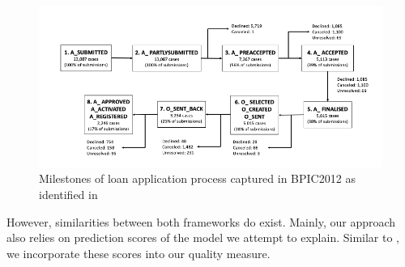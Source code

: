 \documentclass[./../../paper.tex]{subfiles}
\begin{document}
\begin{figure}[htbp]
    \centering
    \includegraphics[width=\textwidth]{figures/milestones.png}
    \caption{Milestones of loan application process captured in BPIC2012 as
    identified in \autocite{bautista_ProcessMiningDrivenOptimization_2012}}
    \label{fig:milestones}
\end{figure}

However, similarities between both frameworks do exist. Mainly, our approach also relies on prediction scores of the model we attempt to explain. Similar to \citeauthor{hsieh_DiCE4ELInterpretingProcess_2021}, we incorporate these scores into our quality measure. 

\end{document}
